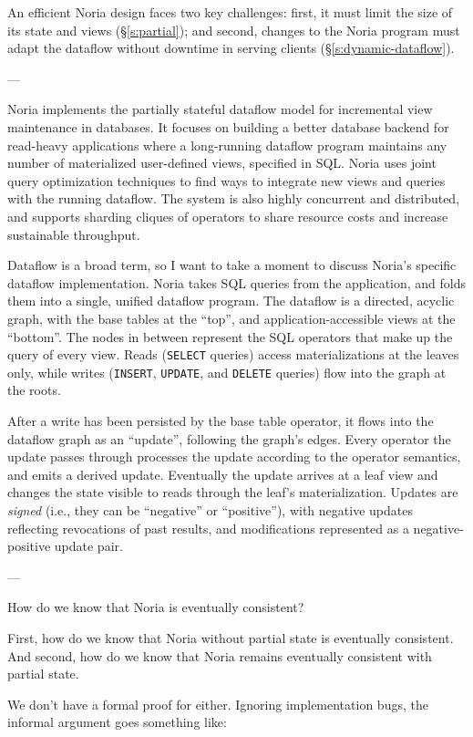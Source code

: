 %
An efficient Noria design faces two key challenges: first, it must limit the
size of its state and views (\S\ref{s:partial}); and second, changes to the
Noria program must adapt the dataflow without downtime in serving clients
(\S\ref{s:dynamic-dataflow}).
%

---

Noria implements the partially stateful dataflow model for incremental view
maintenance in databases. It focuses on building a better database backend for
read-heavy applications where a long-running dataflow program maintains any
number of materialized user-defined views, specified in SQL. Noria uses joint
query optimization techniques to find ways to integrate new views and queries
with the running dataflow. The system is also highly concurrent and distributed,
and supports sharding cliques of operators to share resource costs and increase
sustainable throughput.

Dataflow is a broad term, so I want to take a moment to discuss Noria's specific
dataflow implementation. Noria takes SQL queries from the application, and folds
them into a single, unified dataflow program. The dataflow is a directed,
acyclic graph, with the base tables at the ``top'', and application-accessible
views at the ``bottom''. The nodes in between represent the SQL operators that
make up the query of every view. Reads (\texttt{SELECT} queries) access
materializations at the leaves only, while writes (\texttt{INSERT},
\texttt{UPDATE}, and \texttt{DELETE} queries) flow into the graph at the roots.

After a write has been persisted by the base table operator, it flows into the
dataflow graph as an ``update'', following the graph's edges. Every operator the
update passes through processes the update according to the operator semantics,
and emits a derived update. Eventually the update arrives at a leaf view and
changes the state visible to reads through the leaf's materialization. Updates
are \emph{signed} (i.e., they can be ``negative'' or ``positive''), with
negative updates reflecting revocations of past results, and modifications
represented as a negative-positive update pair.

---

How do we know that Noria is eventually consistent?

First, how do we know that Noria without partial state is eventually
consistent. And second, how do we know that Noria remains eventually
consistent with partial state.

We don't have a formal proof for either. Ignoring implementation bugs, the
informal argument goes something like:


